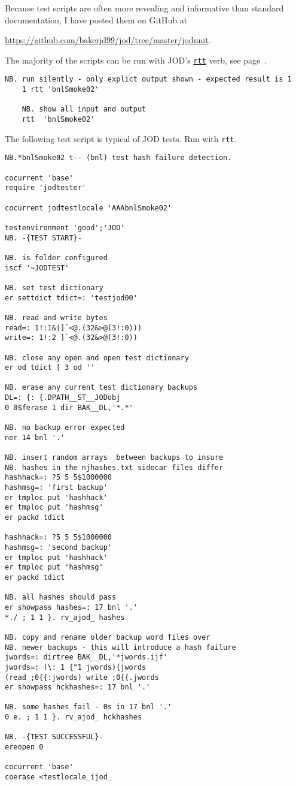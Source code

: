\noindent Because test scripts are often more revealing and informative than
standard documentation, I have posted them on GitHub at

\medskip
\small \url{https://github.com/bakerjd99/jod/tree/master/jodunit}. \normalsize 
\medskip

\noindent The majority
of the scripts can be run with JOD's \hyperlink{il:rtt}{\texttt{rtt}} verb, see page~\pageref{ss:rtt}.

\begin{lstlisting}[frame=single,framerule=0pt,basicstyle=\ttfamily\footnotesize]    
    NB. run silently - only explict output shown - expected result is 1
    1 rtt 'bnlSmoke02'

    NB. show all input and output
    rtt  'bnlSmoke02'
\end{lstlisting} 

\noindent The following test script is typical of JOD tests. Run with {\texttt{rtt}}.

\begin{lstlisting}[frame=single,framerule=0pt,basicstyle=\ttfamily\footnotesize] 
NB.*bnlSmoke02 t-- (bnl) test hash failure detection.

cocurrent 'base'
require 'jodtester'

cocurrent jodtestlocale 'AAAbnlSmoke02'

testenvironment 'good';'JOD'
NB. -{TEST START}-

NB. is folder configured
iscf '~JODTEST'

NB. set test dictionary
er settdict tdict=: 'testjod00'

NB. read and write bytes
read=: 1!:1&(]`<@.(32&>@(3!:0)))
write=: 1!:2 ]`<@.(32&>@(3!:0))

NB. close any open and open test dictionary
er od tdict [ 3 od ''

NB. erase any current test dictionary backups
DL=: {: {.DPATH__ST__JODobj
0 0$ferase 1 dir BAK__DL,'*.*'

NB. no backup error expected
ner 14 bnl '.'

NB. insert random arrays  between backups to insure
NB. hashes in the njhashes.txt sidecar files differ
hashhack=: ?5 5 5$1000000
hashmsg=: 'first backup'
er tmploc put 'hashhack'
er tmploc put 'hashmsg'
er packd tdict

hashhack=: ?5 5 5$1000000
hashmsg=: 'second backup'
er tmploc put 'hashhack'
er tmploc put 'hashmsg'
er packd tdict

NB. all hashes should pass
er showpass hashes=: 17 bnl '.'
*./ ; 1 1 }. rv_ajod_ hashes

NB. copy and rename older backup word files over
NB. newer backups - this will introduce a hash failure
jwords=: dirtree BAK__DL,'*jwords.ijf'
jwords=: (\: 1 {"1 jwords){jwords
(read ;0{{:jwords) write ;0{{.jwords
er showpass hckhashes=: 17 bnl '.'

NB. some hashes fail - 0s in 17 bnl '.'
0 e. ; 1 1 }. rv_ajod_ hckhashes

NB. -{TEST SUCCESSFUL}-
ereopen 0

cocurrent 'base'
coerase <testlocale_ijod_
\end{lstlisting}   

